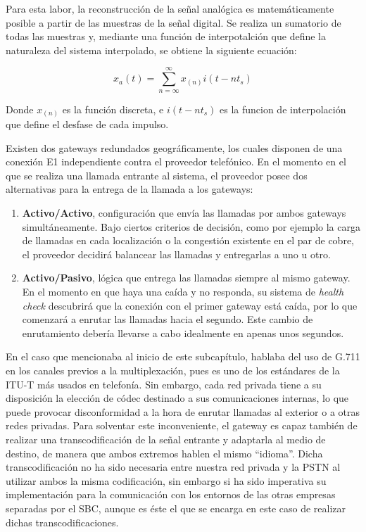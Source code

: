 \documentclass[a4paper, 12pt]{book}
\begin{document}
Para esta labor, la reconstrucción de la señal analógica es matemáticamente posible a partir de las muestras de la señal digital. Se realiza un sumatorio de todas las muestras y, mediante una función de interpotalción que define la naturaleza del sistema interpolado, se obtiene la siguiente ecuación:

\[
x_{a}(t) = \sum_{n=\infty}^\infty x_{(n)}i(t-nt_{s})
\]

Donde $x_{(n)}$ es la función discreta, e $i(t-nt_{s})$ es la funcion de interpolación que define el desfase de cada impulso.

Existen dos gateways redundados geográficamente, los cuales disponen de una conexión E1 independiente contra el proveedor telefónico. En el momento en el que se realiza una llamada entrante al sistema, el proveedor posee dos alternativas para la entrega de la llamada a los gateways:

\begin{enumerate}
  \item \textbf{Activo/Activo}, configuración que envía las llamadas por ambos gateways simultáneamente. Bajo ciertos criterios de decisión, como por ejemplo la carga de llamadas en cada localización o la congestión existente en el par de cobre, el proveedor decidirá balancear las llamadas y entregarlas a uno u otro.
  \item \textbf{Activo/Pasivo}, lógica que entrega las llamadas siempre al mismo gateway. En el momento en que haya una caída y no responda, su sistema de \emph{health check} descubrirá que la conexión con el primer gateway está caída, por lo que comenzará a enrutar las llamadas hacia el segundo. Este cambio de enrutamiento debería llevarse a cabo idealmente en apenas unos segundos.
\end{enumerate}

En el caso que mencionaba al inicio de este subcapítulo, hablaba del uso de G.711 en los canales previos a la multiplexación, pues es uno de los estándares de la ITU-T más usados en telefonía. Sin embargo, cada red privada tiene a su disposición la elección de códec destinado a sus comunicaciones internas, lo que puede provocar disconformidad a la hora de enrutar llamadas al exterior o a otras redes privadas. 
Para solventar este inconveniente, el gateway es capaz también de realizar una transcodificación de la señal entrante y adaptarla al medio de destino, de manera que ambos extremos hablen el mismo ``idioma''. Dicha transcodificación no ha sido necesaria entre nuestra red privada y la PSTN al utilizar ambos la misma codificación, sin embargo si ha sido imperativa su implementación para la comunicación con los entornos de las otras empresas separadas por el SBC, aunque es éste el que se encarga en este caso de realizar dichas transcodificaciones.
\end{document}
